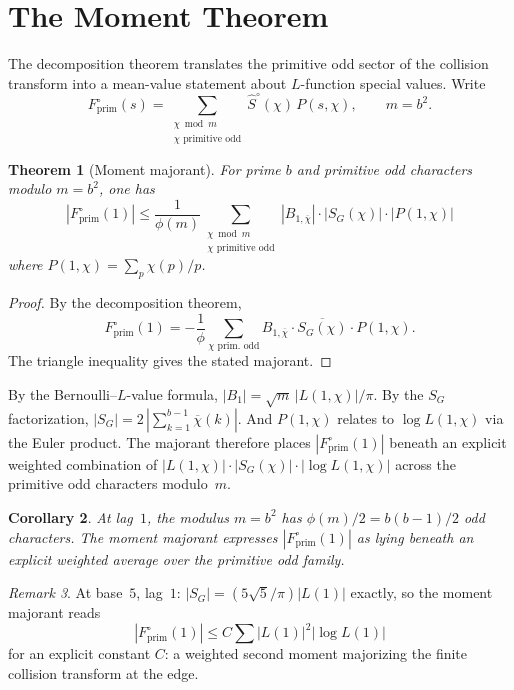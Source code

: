 \documentclass[12pt]{amsart}
\newtheorem{theorem}{Theorem}
\newtheorem{corollary}[theorem]{Corollary}
\theoremstyle{definition}
\theoremstyle{remark}
\newtheorem{remark}[theorem]{Remark}
\begin{document}
\section{The Moment Theorem}

The decomposition theorem translates the primitive odd
sector of the collision transform into a mean-value
statement about $L$-function special values. Write
\[
F^{\circ}_{\mathrm{prim}}(s)
=
\sum_{\substack{\chi \bmod m \\
\chi \text{ primitive odd}}}
\hat{S}^{\circ}(\chi)\, P(s,\chi),
\qquad m=b^2.
\]

\begin{theorem}[Moment majorant]\label{thm:moment}
For prime $b$ and primitive odd characters modulo
$m=b^2$, one has
\[
\left|F^{\circ}_{\mathrm{prim}}(1)\right|
\le
\frac{1}{\phi(m)}
\sum_{\substack{\chi \bmod m \\
\chi \text{ primitive odd}}}
|B_{1,\overline{\chi}}| \cdot |S_G(\chi)|
\cdot |P(1, \chi)|
\]
where
$P(1, \chi) = \sum_p \chi(p)/p$.
\end{theorem}

\begin{proof}
By the decomposition theorem,
\[
F^{\circ}_{\mathrm{prim}}(1)
= -\frac{1}{\phi}\sum_{\chi\text{ prim.\ odd}}
B_{1,\overline{\chi}}\cdot
\overline{S_G(\chi)}\cdot P(1,\chi).
\]
The triangle inequality gives the stated majorant.
\end{proof}

By the Bernoulli--$L$-value formula,
$|B_1|=\sqrt{m}\,|L(1,\chi)|/\pi$.
By the $S_G$ factorization,
$|S_G|=2\,|\sum_{k=1}^{b-1}\overline{\chi}(k)|$.
And $P(1,\chi)$ relates to $\log L(1,\chi)$ via the
Euler product. The majorant therefore places
$|F^{\circ}_{\mathrm{prim}}(1)|$ beneath an explicit
weighted combination of
$|L(1,\chi)|\cdot|S_G(\chi)|\cdot|\log L(1,\chi)|$
across the primitive odd characters modulo~$m$.

\begin{corollary}
At lag~$1$, the modulus $m = b^2$
has $\phi(m)/2 = b(b{-}1)/2$ odd characters. The
moment majorant expresses
$|F^{\circ}_{\mathrm{prim}}(1)|$ as lying beneath an
explicit weighted average over the primitive odd family.
\end{corollary}

\begin{remark}
At base~$5$, lag~$1$: $|S_G| = (5\sqrt{5}/\pi)
|L(1)|$ exactly, so the moment majorant reads
\[
\left|F^{\circ}_{\mathrm{prim}}(1)\right|
\le C \sum |L(1)|^2 |\log L(1)|
\]
for an explicit constant $C$: a weighted second
moment majorizing the finite collision transform at
the edge.
\end{remark}
\end{document}
